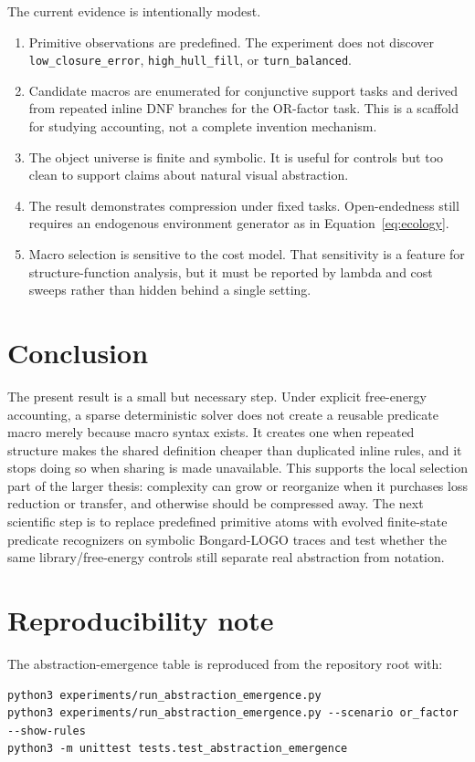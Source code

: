 \documentclass[11pt]{article}
\begin{document}
The current evidence is intentionally modest.
\begin{enumerate}[leftmargin=1.5em]
  \item Primitive observations are predefined. The experiment does not discover
  \texttt{low\_closure\_error}, \texttt{high\_hull\_fill}, or
  \texttt{turn\_balanced}.
  \item Candidate macros are enumerated for conjunctive support tasks and
  derived from repeated inline DNF branches for the OR-factor task. This is a
  scaffold for studying accounting, not a complete invention mechanism.
  \item The object universe is finite and symbolic. It is useful for controls
  but too clean to support claims about natural visual abstraction.
  \item The result demonstrates compression under fixed tasks. Open-endedness
  still requires an endogenous environment generator as in Equation~\ref{eq:ecology}.
  \item Macro selection is sensitive to the cost model. That sensitivity is a
  feature for structure-function analysis, but it must be reported by lambda and
  cost sweeps rather than hidden behind a single setting.
\end{enumerate}

\section{Conclusion}

The present result is a small but necessary step. Under explicit free-energy
accounting, a sparse deterministic solver does not create a reusable predicate
macro merely because macro syntax exists. It creates one when repeated structure
makes the shared definition cheaper than duplicated inline rules, and it stops
doing so when sharing is made unavailable. This supports the local selection
part of the larger thesis: complexity can grow or reorganize when it purchases
loss reduction or transfer, and otherwise should be compressed away. The next
scientific step is to replace predefined primitive atoms with evolved
finite-state predicate recognizers on symbolic Bongard-LOGO traces and test
whether the same library/free-energy controls still separate real abstraction
from notation.

\section*{Reproducibility note}

The abstraction-emergence table is reproduced from the repository root with:
\begin{verbatim}
python3 experiments/run_abstraction_emergence.py
python3 experiments/run_abstraction_emergence.py --scenario or_factor --show-rules
python3 -m unittest tests.test_abstraction_emergence
\end{verbatim}



\end{document}
